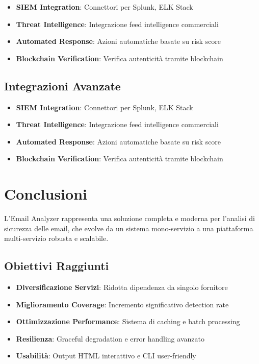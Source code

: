 \documentclass{article}
\begin{document}
\begin{itemize}
    \item \textbf{SIEM Integration}: Connettori per Splunk, ELK Stack
    \item \textbf{Threat Intelligence}: Integrazione feed intelligence commerciali
    \item \textbf{Automated Response}: Azioni automatiche basate su risk score
    \item \textbf{Blockchain Verification}: Verifica autenticità tramite blockchain
\end{itemize}

\subsection{Integrazioni Avanzate}

\begin{itemize}
    \item \textbf{SIEM Integration}: Connettori per Splunk, ELK Stack
    \item \textbf{Threat Intelligence}: Integrazione feed intelligence commerciali
    \item \textbf{Automated Response}: Azioni automatiche basate su risk score
    \item \textbf{Blockchain Verification}: Verifica autenticità tramite blockchain
\end{itemize}

\section{Conclusioni}

L'Email Analyzer rappresenta una soluzione completa e moderna per l'analisi di sicurezza delle email, che evolve da un sistema mono-servizio a una piattaforma multi-servizio robusta e scalabile.

\subsection{Obiettivi Raggiunti}

\begin{itemize}
    \item  \textbf{Diversificazione Servizi}: Ridotta dipendenza da singolo fornitore
    \item  \textbf{Miglioramento Coverage}: Incremento significativo detection rate
    \item  \textbf{Ottimizzazione Performance}: Sistema di caching e batch processing
    \item  \textbf{Resilienza}: Graceful degradation e error handling avanzato
    \item  \textbf{Usabilità}: Output HTML interattivo e CLI user-friendly
\end{itemize}
\end{document}
